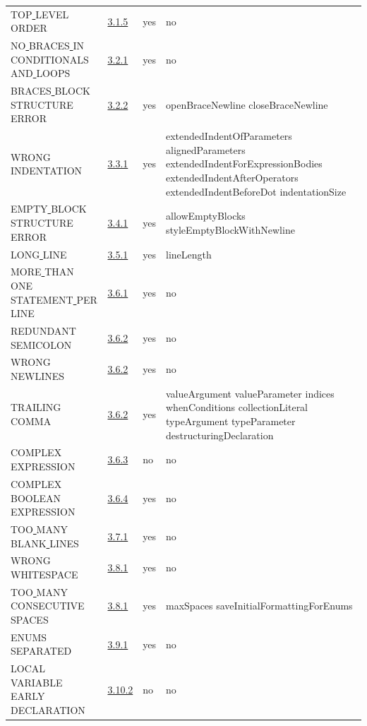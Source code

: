 \begin{longtable}{ |l|p{0.8cm}|p{0.8cm}| p{3cm} | }
TOP\underline{ }LEVEL\underline{ }ORDER & \hyperref[sec:3.1.5]{3.1.5} &  yes  &   no  \\
NO\underline{ }BRACES\underline{ }IN\underline{ }CONDITIONALS\underline{ }AND\underline{ }LOOPS & \hyperref[sec:3.2.1]{3.2.1} &  yes  &   no  \\
BRACES\underline{ }BLOCK\underline{ }STRUCTURE\underline{ }ERROR & \hyperref[sec:3.2.2]{3.2.2} &  yes  &   openBraceNewline closeBraceNewline  \\
WRONG\underline{ }INDENTATION & \hyperref[sec:3.3.1]{3.3.1} &  yes  &  extendedIndentOfParameters alignedParameters extendedIndentForExpressionBodies extendedIndentAfterOperators extendedIndentBeforeDot indentationSize   \\
EMPTY\underline{ }BLOCK\underline{ }STRUCTURE\underline{ }ERROR & \hyperref[sec:3.4.1]{3.4.1} &  yes  &   allowEmptyBlocks styleEmptyBlockWithNewline  \\
LONG\underline{ }LINE & \hyperref[sec:3.5.1]{3.5.1} &  yes  &   lineLength                 \\
MORE\underline{ }THAN\underline{ }ONE\underline{ }STATEMENT\underline{ }PER\underline{ }LINE & \hyperref[sec:3.6.1]{3.6.1} &  yes  &   no  \\
REDUNDANT\underline{ }SEMICOLON & \hyperref[sec:3.6.2]{3.6.2} &  yes  &   no  \\
WRONG\underline{ }NEWLINES & \hyperref[sec:3.6.2]{3.6.2} &  yes  &   no  \\
TRAILING\underline{ }COMMA & \hyperref[sec:3.6.2]{3.6.2} &  yes  &   valueArgument valueParameter indices whenConditions collectionLiteral typeArgument typeParameter destructuringDeclaration  \\
COMPLEX\underline{ }EXPRESSION & \hyperref[sec:3.6.3]{3.6.3} &  no  &   no  \\
COMPLEX\underline{ }BOOLEAN\underline{ }EXPRESSION & \hyperref[sec:3.6.4]{3.6.4} &  yes  &   no    \\
TOO\underline{ }MANY\underline{ }BLANK\underline{ }LINES & \hyperref[sec:3.7.1]{3.7.1} &  yes  &   no  \\
WRONG\underline{ }WHITESPACE & \hyperref[sec:3.8.1]{3.8.1} &  yes  &   no  \\
TOO\underline{ }MANY\underline{ }CONSECUTIVE\underline{ }SPACES & \hyperref[sec:3.8.1]{3.8.1} &  yes  &   maxSpaces saveInitialFormattingForEnums  \\
ENUMS\underline{ }SEPARATED & \hyperref[sec:3.9.1]{3.9.1} &  yes  &   no  \\
LOCAL\underline{ }VARIABLE\underline{ }EARLY\underline{ }DECLARATION & \hyperref[sec:3.10.2]{3.10.2} &  no  &   no  \\

\end{longtable}
